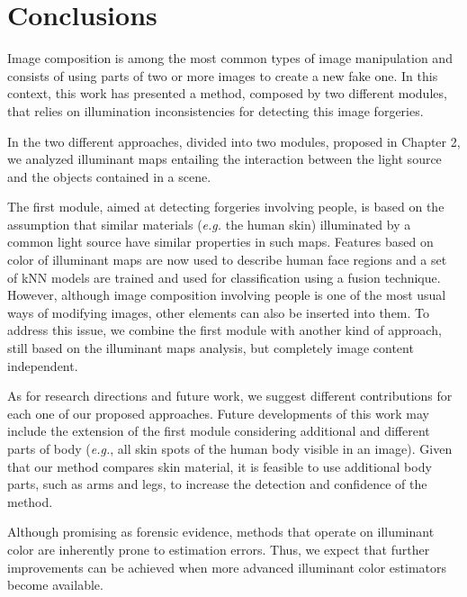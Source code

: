 \chapter*{Conclusions}

Image composition is among the most common types of image manipulation and consists of using parts of two or more images to create a new fake one. In this context, this work has presented a method, composed by two different modules, that relies on illumination inconsistencies for detecting this image forgeries.

In the two different approaches, divided into two modules, proposed in Chapter 2, we analyzed illuminant maps entailing the interaction between the light source and the objects contained in a scene. 

The first module, aimed at detecting forgeries involving people, is based on the assumption that similar materials (\emph{e.g.} the human skin) illuminated by a common light source have similar properties in such maps. Features based on color of illuminant maps are now used to describe human face regions and a set of kNN models are trained and used for classification using a fusion technique. However, although image composition involving people is one of the most usual ways of modifying images, other elements can also be inserted into them. To address this issue, we combine the first module with another kind of approach, still based on the illuminant maps analysis, but completely image content independent.

As for research directions and future work, we suggest different contributions for each one of our proposed approaches. Future developments of this work may include the extension of the first module considering additional and different parts of body (\emph{e.g.}, all skin spots of the human body visible in an image). Given that our method compares skin material, it is feasible to use additional body parts, such as arms and legs, to increase the detection and confidence of the method.

Although promising as forensic evidence, methods that operate on illuminant color are inherently prone to estimation errors. Thus, we expect that further improvements can be achieved when more advanced illuminant color estimators become available.
